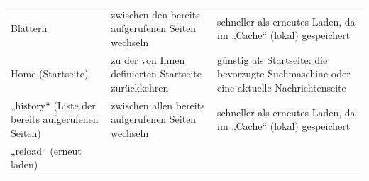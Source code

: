 \documentclass[]{book}
\theoremstyle{definition}
\theoremstyle{definition}
\theoremstyle{definition}
\theoremstyle{remark}
\begin{document}
\begin{longtable}[]{@{}lll@{}}
\begin{minipage}[t]{0.31\columnwidth}\raggedright\strut
Blättern \vspace{5mm}\strut
\end{minipage} & \begin{minipage}[t]{0.27\columnwidth}\raggedright\strut
zwischen den bereits aufgerufenen Seiten wechseln \vspace{5mm}\strut
\end{minipage} & \begin{minipage}[t]{0.33\columnwidth}\raggedright\strut
schneller als erneutes Laden, da im „Cache`` (lokal) gespeichert
\vspace{5mm}\strut
\end{minipage}\tabularnewline
\begin{minipage}[t]{0.31\columnwidth}\raggedright\strut
Home (Startseite) \vspace{5mm}\strut
\end{minipage} & \begin{minipage}[t]{0.27\columnwidth}\raggedright\strut
zu der von Ihnen definierten Startseite zurückkehren \vspace{5mm}\strut
\end{minipage} & \begin{minipage}[t]{0.33\columnwidth}\raggedright\strut
günstig als Startseite: die bevorzugte Suchmaschine oder eine aktuelle
Nachrichtenseite\vspace{5mm}\strut
\end{minipage}\tabularnewline
\begin{minipage}[t]{0.31\columnwidth}\raggedright\strut
„history`` (Liste der bereits aufgerufenen Seiten) \vspace{5mm}\strut
\end{minipage} & \begin{minipage}[t]{0.27\columnwidth}\raggedright\strut
zwischen allen bereits aufgerufenen Seiten wechseln \vspace{5mm}\strut
\end{minipage} & \begin{minipage}[t]{0.33\columnwidth}\raggedright\strut
schneller als erneutes Laden, da im „Cache`` (lokal) gespeichert
\vspace{5mm}\strut
\end{minipage}\tabularnewline
\begin{minipage}[t]{0.31\columnwidth}\raggedright\strut
„reload`` (erneut laden) \vspace{5mm}\strut
\end{minipage} & \begin{minipage}[t]{0.27\columnwidth}\raggedright\strut

\end{minipage}
\end{longtable}
\end{document}
